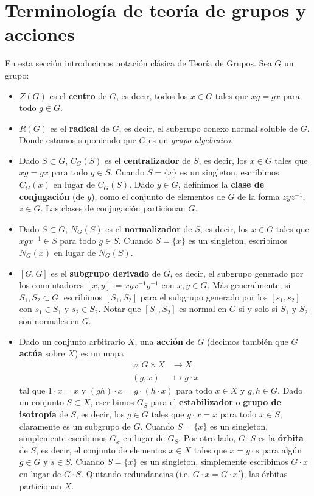 \documentclass[spanish,12pt]{amsart}
\theoremstyle{definition}
\theoremstyle{remark}
\numberwithin{equation}{section}
\begin{document}
\section{Terminología de teoría de grupos y acciones}
En esta sección introducimos notación clásica de Teoría de Grupos. Sea $G$ un grupo:
\begin{itemize}
\item $Z(G)$ es el \textbf{centro} de $G$, es decir, todos los $x \in G$ tales que $x g = g x$ para todo $g \in G$.
\item $R(G)$ es el \textbf{radical} de $G$, es decir, el subgrupo conexo normal soluble de $G$. Donde estamos suponiendo que $G$ es un \textit{grupo algebraico}.
\item Dado $S \subset G$, $C_G (S)$ es el \textbf{centralizador} de $S$, es decir, los $x \in G$ tales que $x g = g x$ para todo $g \in S$. Cuando $S = \{x\}$ es un singleton, escribimos $C_G (x)$ en lugar de $C_G (S)$. Dado $y \in G$, definimos la \textbf{clase de conjugación} (de $y$), como el conjunto de elementos de $G$ de la forma $z y z^{-1}$, $z \in G$. Las clases de conjugación particionan $G$.
\item Dado $S \subset G$, $N_G (S)$ es el \textbf{normalizador} de $S$, es decir, los $x \in G$ tales que $x g x^{-1} \in S$ para todo $g \in S$. Cuando $S = \{x\}$ es un singleton, escribimos $N_G (x)$ en lugar de $N_G (S)$.
\item $[G,G]$ es el \textbf{subgrupo derivado} de $G$, es decir, el subgrupo generado por los conmutadores $[x,y] := x y x^{-1}y^{-1}$ con $x,y \in G$. Más generalmente, si $S_1, S_2 \subset G$, escribimos $[S_1, S_2]$ para el subgrupo generado por los $[s_1,s_2]$ con $s_1 \in S_1 $ y $s_2 \in S_2$. Notar que $[S_1,S_2]$ es normal en $G$ si y solo si $S_1$ y $S_2$ son normales en $G$.
\item Dado un conjunto arbitrario $X$, una \textbf{acción} de $G$ (decimos también que $G$ \textbf{actúa} sobre $X$) es un mapa
\begin{align*}
\varphi : G \times X &\longrightarrow X \\
(g,x) &\longmapsto g \cdot x
\end{align*}
tal que $1 \cdot x = x$ y $(gh) \cdot x = g \cdot (h \cdot x)$ para todo $x \in X$ y $g,h \in G$. Dado un conjunto $S \subset X$, escribimos $G_S$ para el \textbf{estabilizador} o \textbf{grupo de isotropía} de $S$, es decir, los $g \in G$ tales que $g \cdot x = x$ para todo $x \in S$; claramente es un subgrupo de $G$. Cuando $S = \{x\}$ es un singleton, simplemente escribimos $G_x$ en lugar de $G_S$. Por otro lado, $G \cdot S$ es la \textbf{órbita} de $S$, es decir, el conjunto de elementos $x \in X$ tales que $x = g \cdot s$ para algún $g \in G$ y $s \in S$. Cuando $S = \{x\}$ es un singleton, simplemente escribimos $G \cdot x$ en lugar de $G\cdot S$. Quitando redundancias (i.e. $G \cdot x = G \cdot x'$), las órbitas particionan $X$.

\end{itemize}
\end{document}
